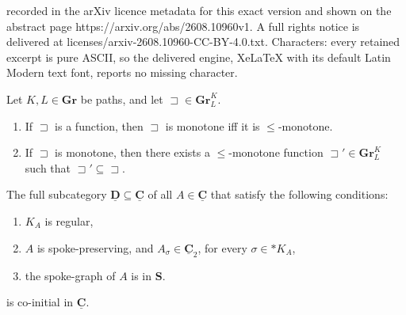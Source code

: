 \documentclass[10pt,a4paper]{amsart}
\newcommand \CCub{\underline{\mathbf{C}}}
\newcommand \DDub{\underline{\mathbf{D}}}
\newcommand \GGRb{\mathbf{Gr}}
\newcommand \SSb{\mathbf{S}}
\newcommand \sqsp{\sqsupset}
\begin{document}
recorded in the arXiv licence metadata for this exact version and shown on the abstract page https://arxiv.org/abs/2608.10960v1. A full rights notice is delivered at licenses/arxiv-2608.10960-CC-BY-4.0.txt. Characters: every retained excerpt is pure ASCII, so the delivered engine, XeLaTeX with its default Latin Modern text font, reports no missing character.
\begin{corollary}
\label{co:CharCMon}
Let $K, L \in \GGRb$ be paths, and let $\sqsp \in \GGRb^K_L$.
\begin{enumerate}
	\item If $\sqsp$ is  a function, then $\sqsp$ is monotone iff it is $\leq$-monotone.
	\item  If $\sqsp$ is monotone, then there exists a $\leq$-monotone function $\sqsp' \in \GGRb^K_L$ such that $\sqsp' \subseteq \sqsp$.
\end{enumerate}
\end{corollary} 

\begin{proposition}
	\label{pr:CatMCoInitial}
	The full subcategory $\DDub \subseteq \CCub$ of all $A \in \CCub$ that satisfy the following conditions:
	\begin{enumerate}
		\item $K_{A}$ is regular,
		\item $A$ is spoke-preserving, and $A_{\sigma} \in \CCub_2$, for every  $\sigma \in *K_A$,
		\item the spoke-graph of $A$ is in $\SSb$.
	\end{enumerate}
	is co-initial in $\CCub$.
\end{proposition}
\end{document}

